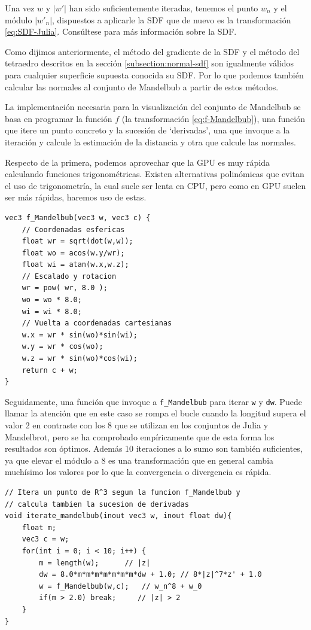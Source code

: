 Una vez $w$ y $|w'|$ han sido suficientemente iteradas, tenemos el punto $w_n$ y el módulo $|w'_n|$, dispuestos a aplicarle la SDF que de nuevo es la transformación \ref{eq:SDF-Julia}. Consúltese \cite{mandelbub} para más información sobre la SDF.

Como dijimos anteriormente, el método del gradiente de la SDF y el método del tetraedro descritos en la sección \ref{subsection:normal-sdf} son igualmente válidos para cualquier superficie supuesta conocida su SDF. Por lo que podemos también calcular las normales al conjunto de Mandelbub a partir de estos métodos.

La implementación necesaria para la visualización del conjunto de Mandelbub se basa en programar la función $f$ (la transformación \ref{eq:f-Mandelbub}), una función que itere un punto concreto y la sucesión de `derivadas', una que invoque a la iteración y calcule la estimación de la distancia y otra que calcule las normales.

Respecto de la primera, podemos aprovechar que la GPU es muy rápida calculando funciones trigonométricas. Existen alternativas polinómicas que evitan el uso de trigonometría, la cual suele ser lenta en CPU, pero como en GPU suelen ser más rápidas, haremos uso de estas. 
\begin{lstlisting}
vec3 f_Mandelbub(vec3 w, vec3 c) {
    // Coordenadas esfericas
    float wr = sqrt(dot(w,w));
    float wo = acos(w.y/wr);
    float wi = atan(w.x,w.z);
    // Escalado y rotacion
    wr = pow( wr, 8.0 );
    wo = wo * 8.0;
    wi = wi * 8.0;
    // Vuelta a coordenadas cartesianas
    w.x = wr * sin(wo)*sin(wi);
    w.y = wr * cos(wo);
    w.z = wr * sin(wo)*cos(wi);
    return c + w;
}
\end{lstlisting}

Seguidamente, una función que invoque a \verb|f_Mandelbub| para iterar \verb|w| y \verb|dw|. Puede llamar la atención que en este caso se rompa el bucle cuando la longitud supera el valor 2 en contraste con los 8 que se utilizan en los conjuntos de Julia y Mandelbrot, pero se ha comprobado empíricamente que de esta forma los resultados son óptimos. Además 10 iteraciones a lo sumo son también suficientes, ya que elevar el módulo a $8$ es una transformación que en general cambia muchísimo los valores por lo que la convergencia o divergencia es rápida.

\begin{lstlisting}
// Itera un punto de R^3 segun la funcion f_Mandelbub y
// calcula tambien la sucesion de derivadas
void iterate_mandelbub(inout vec3 w, inout float dw){
    float m;
    vec3 c = w;
    for(int i = 0; i < 10; i++) {
        m = length(w);      // |z|
        dw = 8.0*m*m*m*m*m*m*m*dw + 1.0; // 8*|z|^7*z' + 1.0
        w = f_Mandelbub(w,c);   // w_n^8 + w_0
        if(m > 2.0) break;     // |z| > 2
    }
}
\end{lstlisting}

